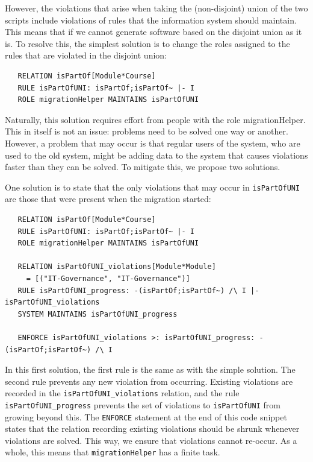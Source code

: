 \documentclass{elsarticle}
\begin{document}
However, the violations that arise when taking the (non-disjoint) union of the two scripts include violations of rules that the information system should maintain.
This means that if we cannot generate software based on the disjoint union as it is.
To resolve this, the simplest solution is to change the roles assigned to the rules that are violated in the disjoint union:
\begin{verbatim}
   RELATION isPartOf[Module*Course]
   RULE isPartOfUNI: isPartOf;isPartOf~ |- I
   ROLE migrationHelper MAINTAINS isPartOfUNI
\end{verbatim}

Naturally, this solution requires effort from people with the role migrationHelper.
This in itself is not an issue: problems need to be solved one way or another.
However, a problem that may occur is that regular users of the system, who are used to the old system, might be adding data to the system that causes violations faster than they can be solved.
To mitigate this, we propose two solutions.

One solution is to state that the only violations that may occur in \verb=isPartOfUNI= are those that were present when the migration started:
\begin{verbatim}
   RELATION isPartOf[Module*Course]
   RULE isPartOfUNI: isPartOf;isPartOf~ |- I
   ROLE migrationHelper MAINTAINS isPartOfUNI
   
   RELATION isPartOfUNI_violations[Module*Module]
     = [("IT-Governance", "IT-Governance")]
   RULE isPartOfUNI_progress: -(isPartOf;isPartOf~) /\ I |- isPartOfUNI_violations
   SYSTEM MAINTAINS isPartOfUNI_progress
   
   ENFORCE isPartOfUNI_violations >: isPartOfUNI_progress: -(isPartOf;isPartOf~) /\ I  
\end{verbatim}

In this first solution, the first rule is the same as with the simple solution.
The second rule prevents any new violation from occurring.
Existing violations are recorded in the \verb=isPartOfUNI_violations= relation, and the rule \verb=isPartOfUNI_progress= prevents the set of violations to \verb=isPartOfUNI= from growing beyond this.
The \verb=ENFORCE= statement at the end of this code snippet states that the relation recording existing violations should be shrunk whenever violations are solved.
This way, we ensure that violations cannot re-occur.
As a whole, this means that \verb=migrationHelper= has a finite task.
\end{document}
